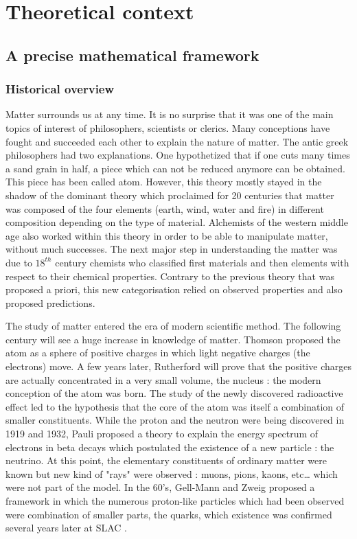 \part{Theoretical context}
\label{sec:orgc95725b}
\chapter{A precise mathematical framework}
\label{sec:org5eabaf8}
\section{Historical overview}
\label{sec:org6825fe7}
Matter surrounds us at any time.
It is no surprise that it was one of the main topics of interest of philosophers, scientists or clerics.
Many conceptions have fought and succeeded each other to explain the nature of matter.
The antic greek philosophers had two explanations.
One hypothetized that if one cuts many times a sand grain in half, a piece which can not be reduced anymore can be obtained.
This piece has been called atom.
However, this theory mostly stayed in the shadow of the dominant theory which proclaimed for 20 centuries that matter was composed of the four elements (earth, wind, water and fire) in different composition depending on the type of material.
Alchemists of the western middle age also worked within this theory in order to be able to manipulate matter, without much successes.
The next major step in understanding the matter was due to $18^{th}$ century chemists who classified first materials and then elements with respect to their chemical properties.
Contrary to the previous theory that was proposed a priori, this new categorisation relied on observed properties and also proposed predictions.

The study of matter entered the era of modern scientific method.
The following century will see a huge increase in knowledge of matter.
Thomson proposed the atom as a sphere of positive charges in which light negative charges (the electrons) move.
A few years later, Rutherford will prove that the positive charges are actually concentrated in a very small volume, the nucleus : the modern conception of the atom was born.
The study of the newly discovered radioactive effect led to the hypothesis that the core of the atom was itself a combination of smaller constituents.
While the proton and the neutron were being discovered in 1919 and 1932, Pauli proposed a theory to explain the energy spectrum of electrons in beta decays which postulated the existence of a new particle : the neutrino.
At this point, the elementary constituents of ordinary matter were known but new kind of "rays" were observed : muons, pions, kaons, etc\ldots{} which were not part of the model.
In the 60's, Gell-Mann \cite{GellMann:1964nj} and Zweig \cite{Zweig:352337} proposed a framework in which the numerous proton-like particles which had been observed were combination of smaller parts, the quarks, which existence was confirmed several years later at SLAC \cite{Bloom:1969kc,Breidenbach:1969kd}.

